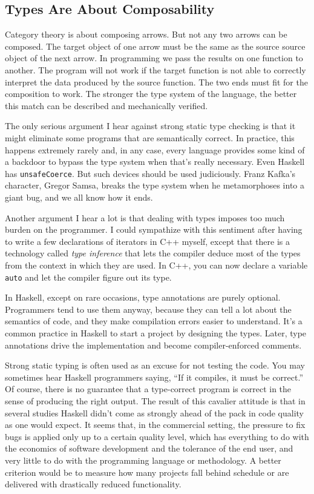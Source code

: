 \subsection{Types Are About
Composability}\label{types-are-about-composability}

Category theory is about composing arrows. But not any two arrows can be
composed. The target object of one arrow must be the same as the source
source object of the next arrow. In programming we pass the results on
one function to another. The program will not work if the target
function is not able to correctly interpret the data produced by the
source function. The two ends must fit for the composition to work. The
stronger the type system of the language, the better this match can be
described and mechanically verified.

The only serious argument I hear against strong static type checking is
that it might eliminate some programs that are semantically correct. In
practice, this happens extremely rarely and, in any case, every language
provides some kind of a backdoor to bypass the type system when that's
really necessary. Even Haskell has \texttt{unsafeCoerce}. But such
devices should be used judiciously. Franz Kafka's character, Gregor
Samsa, breaks the type system when he metamorphoses into a giant bug,
and we all know how it ends.

Another argument I hear a lot is that dealing with types imposes too
much burden on the programmer. I could sympathize with this sentiment
after having to write a few declarations of iterators in C++ myself,
except that there is a technology called \emph{type inference} that lets
the compiler deduce most of the types from the context in which they are
used. In C++, you can now declare a variable \texttt{auto} and let the
compiler figure out its type.

In Haskell, except on rare occasions, type annotations are purely
optional. Programmers tend to use them anyway, because they can tell a
lot about the semantics of code, and they make compilation errors easier
to understand. It's a common practice in Haskell to start a project by
designing the types. Later, type annotations drive the implementation
and become compiler-enforced comments.

Strong static typing is often used as an excuse for not testing the
code. You may sometimes hear Haskell programmers saying, ``If it
compiles, it must be correct.'' Of course, there is no guarantee that a
type-correct program is correct in the sense of producing the right
output. The result of this cavalier attitude is that in several studies
Haskell didn't come as strongly ahead of the pack in code quality as one
would expect. It seems that, in the commercial setting, the pressure to
fix bugs is applied only up to a certain quality level, which has
everything to do with the economics of software development and the
tolerance of the end user, and very little to do with the programming
language or methodology. A better criterion would be to measure how many
projects fall behind schedule or are delivered with drastically reduced
functionality.

